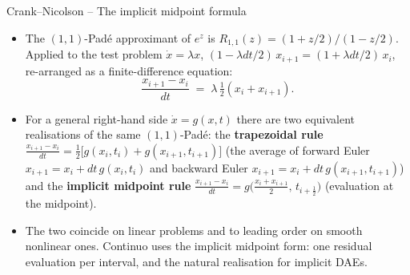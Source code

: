 \documentclass[11pt,aspectratio=169]{beamer}
\begin{document}
\begin{frame}{Crank--Nicolson -- The implicit midpoint formula}

\begin{itemize}

\item The $(1,1)$-Padé approximant of $e^z$ is $R_{1,1}(z) =
  (1+z/2)/(1-z/2)$. Applied to the test problem $\dot x = \lambda x$,
  $(1-\lambda dt/2)\,x_{i+1} = (1+\lambda dt/2)\,x_i$, re-arranged as
  a finite-difference equation:
  \[
  \boxed{\;
  \frac{x_{i+1}-x_i}{dt}
  \;=\;
  \lambda\,\tfrac12(x_i + x_{i+1}).
  \;}
  \]

\item For a general right-hand side $\dot x = g(x,t)$ there are two
  equivalent realisations of the same $(1,1)$-Padé: the
  \textbf{trapezoidal rule} $\tfrac{x_{i+1}-x_i}{dt} = \tfrac12\bigl[g(x_i,t_i)+g(x_{i+1},t_{i+1})\bigr]$
  (the average of forward Euler $x_{i+1} = x_i + dt\,g(x_i,t_i)$ and
  backward Euler $x_{i+1} = x_i + dt\,g(x_{i+1},t_{i+1})$) and the
  \textbf{implicit midpoint rule}
  $\tfrac{x_{i+1}-x_i}{dt} = g\!\bigl(\tfrac{x_i+x_{i+1}}{2},\,
  t_{i+\frac12}\bigr)$ (evaluation at the midpoint).\newline

\item The two coincide on linear problems and to leading order on
  smooth nonlinear ones. Continuo uses the implicit midpoint
  form: one residual evaluation per interval, and the natural
  realisation for implicit DAEs.

\end{itemize}

\end{frame}
\end{document}
